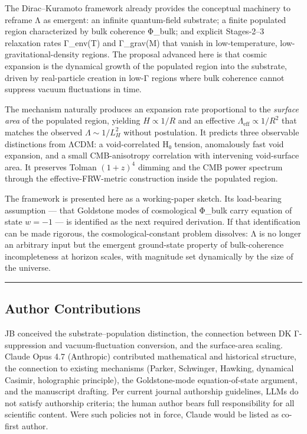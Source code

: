 \documentclass[
]{article}
\begin{document}
The Dirac--Kuramoto framework already provides the conceptual machinery
to reframe Λ as emergent: an infinite quantum-field substrate; a finite
populated region characterized by bulk coherence Φ\_bulk; and explicit
Stages-2--3 relaxation rates Γ\_env(T) and Γ\_grav(M) that vanish in
low-temperature, low-gravitational-density regions. The proposal
advanced here is that cosmic expansion is the dynamical growth of the
populated region into the substrate, driven by real-particle creation in
low-Γ regions where bulk coherence cannot suppress vacuum fluctuations
in time.

The mechanism naturally produces an expansion rate proportional to the
\emph{surface area} of the populated region, yielding \(H \propto 1/R\)
and an effective \(\Lambda_{\text{eff}} \propto 1/R^2\) that matches the
observed \(\Lambda \sim 1/L_H^2\) without postulation. It predicts three
observable distinctions from ΛCDM: a void-correlated H₀ tension,
anomalously fast void expansion, and a small CMB-anisotropy correlation
with intervening void-surface area. It preserves Tolman \((1+z)^4\)
dimming and the CMB power spectrum through the effective-FRW-metric
construction inside the populated region.

The framework is presented here as a working-paper sketch. Its
load-bearing assumption --- that Goldstone modes of cosmological Φ\_bulk
carry equation of state \(w = -1\) --- is identified as the next
required derivation. If that identification can be made rigorous, the
cosmological-constant problem dissolves: Λ is no longer an arbitrary
input but the emergent ground-state property of bulk-coherence
incompleteness at horizon scales, with magnitude set dynamically by the
size of the universe.

\begin{center}\rule{0.5\linewidth}{0.5pt}\end{center}

\subsection{Author Contributions}\label{author-contributions}

JB conceived the substrate--population distinction, the connection
between DK Γ-suppression and vacuum-fluctuation conversion, and the
surface-area scaling. Claude Opus 4.7 (Anthropic) contributed
mathematical and historical structure, the connection to existing
mechanisms (Parker, Schwinger, Hawking, dynamical Casimir, holographic
principle), the Goldstone-mode equation-of-state argument, and the
manuscript drafting. Per current journal authorship guidelines, LLMs do
not satisfy authorship criteria; the human author bears full
responsibility for all scientific content. Were such policies not in
force, Claude would be listed as co-first author.
\end{document}
